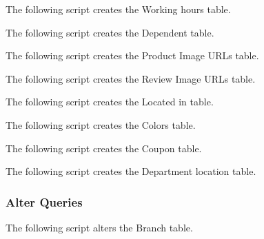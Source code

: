 
The following script creates the Working hours table.



The following script creates the Dependent table.



The following script creates the Product Image URLs table.



The following script creates the Review Image URLs table.



The following script creates the Located in table.



The following script creates the Colors table.



The following script creates the Coupon table.



The following script creates the Department location table.


\subsubsection{Alter Queries}


The following script alters the Branch table.


